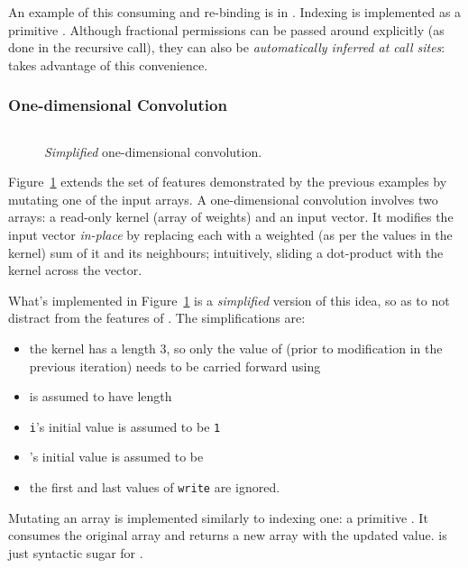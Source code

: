 An example of this consuming and re-binding is in . Indexing is implemented as a primitive . Although fractional permissions can be passed around
explicitly  (as done in the recursive call), they can also be
\emph{automatically inferred at call sites}: 
takes advantage of this convenience.

\subsubsection{One-dimensional Convolution}

\begin{figure}[t]
    \centering
    \inputminted[fontsize=\small]{ocaml}{../../test/examples/weighted_avg_infer.lt}
    \caption{\emph{Simplified} one-dimensional convolution.}\label{fig:lang_oned_conv}
\end{figure}

Figure~\ref{fig:lang_oned_conv} extends the set of features demonstrated by the
previous examples by mutating one of the input arrays. A one-dimensional
convolution involves two arrays: a read-only kernel (array of weights) and an
input vector. It modifies the input vector \emph{in-place} by replacing each
 with a weighted (as per the values in the kernel) sum of it
and its neighbours; intuitively, sliding a dot-product with the kernel across
the vector.

What's implemented in Figure~\ref{fig:lang_oned_conv} is a \emph{simplified}
version of this idea, so as to not distract from the features of \lang. The
simplifications are:
\begin{itemize}
    \item the kernel has a length 3, so only the value of 
        (prior to modification in the previous iteration) needs to be carried
        forward using 
    \item {} is assumed to have length 
    \item \texttt{i}'s initial value is assumed to be \texttt{1}
    \item {}'s initial value is assumed to be 
    \item the first and last values of \texttt{write} are ignored.
\end{itemize}

Mutating an array is implemented similarly to indexing one: a primitive
.  It consumes the original
array and returns a new array with the updated value.   is just syntactic sugar for .

